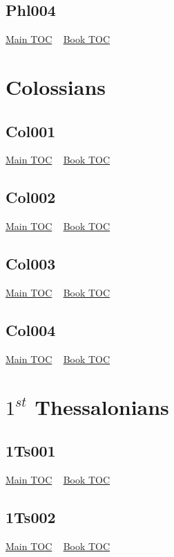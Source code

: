\documentclass{book}
\begin{document}
  \section{Phl004}\hyperlink{toc}{Main TOC} ~ \hyperref[subsec:Phl]{Book TOC} 
  \chapter{Colossians} \label{subsec:Col} \begin{multicols}{2} \minitoc \end{multicols}
  \section{Col001}\hyperlink{toc}{Main TOC} ~ \hyperref[subsec:Col]{Book TOC} 
  \section{Col002}\hyperlink{toc}{Main TOC} ~ \hyperref[subsec:Col]{Book TOC} 
  \section{Col003}\hyperlink{toc}{Main TOC} ~ \hyperref[subsec:Col]{Book TOC} 
  \section{Col004}\hyperlink{toc}{Main TOC} ~ \hyperref[subsec:Col]{Book TOC} 
  \chapter{$1^{st}$ Thessalonians} \label{subsec:1Ts} \begin{multicols}{2} \minitoc \end{multicols}
  \section{1Ts001}\hyperlink{toc}{Main TOC} ~ \hyperref[subsec:1Ts]{Book TOC} 
  \section{1Ts002}\hyperlink{toc}{Main TOC} ~ \hyperref[subsec:1Ts]{Book TOC} 
\end{document}
